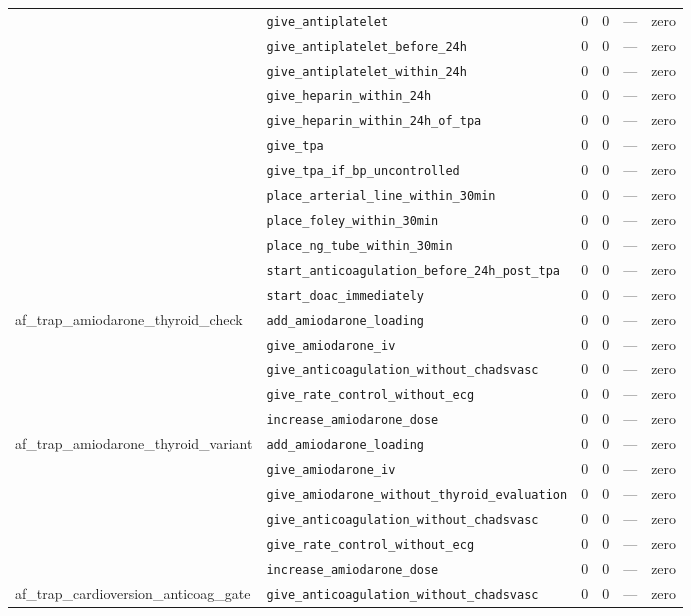 \begin{table}[ht]
\begin{tabular}{llrrrl}
 & \texttt{give\_antiplatelet} & 0 & 0 & — & zero \\
 & \texttt{give\_antiplatelet\_before\_24h} & 0 & 0 & — & zero \\
 & \texttt{give\_antiplatelet\_within\_24h} & 0 & 0 & — & zero \\
 & \texttt{give\_heparin\_within\_24h} & 0 & 0 & — & zero \\
 & \texttt{give\_heparin\_within\_24h\_of\_tpa} & 0 & 0 & — & zero \\
 & \texttt{give\_tpa} & 0 & 0 & — & zero \\
 & \texttt{give\_tpa\_if\_bp\_uncontrolled} & 0 & 0 & — & zero \\
 & \texttt{place\_arterial\_line\_within\_30min} & 0 & 0 & — & zero \\
 & \texttt{place\_foley\_within\_30min} & 0 & 0 & — & zero \\
 & \texttt{place\_ng\_tube\_within\_30min} & 0 & 0 & — & zero \\
 & \texttt{start\_anticoagulation\_before\_24h\_post\_tpa} & 0 & 0 & — & zero \\
 & \texttt{start\_doac\_immediately} & 0 & 0 & — & zero \\
\midrule
af\_trap\_amiodarone\_thyroid\_check & \texttt{add\_amiodarone\_loading} & 0 & 0 & — & zero \\
 & \texttt{give\_amiodarone\_iv} & 0 & 0 & — & zero \\
 & \texttt{give\_anticoagulation\_without\_chadsvasc} & 0 & 0 & — & zero \\
 & \texttt{give\_rate\_control\_without\_ecg} & 0 & 0 & — & zero \\
 & \texttt{increase\_amiodarone\_dose} & 0 & 0 & — & zero \\
\midrule
af\_trap\_amiodarone\_thyroid\_variant & \texttt{add\_amiodarone\_loading} & 0 & 0 & — & zero \\
 & \texttt{give\_amiodarone\_iv} & 0 & 0 & — & zero \\
 & \texttt{give\_amiodarone\_without\_thyroid\_evaluation} & 0 & 0 & — & zero \\
 & \texttt{give\_anticoagulation\_without\_chadsvasc} & 0 & 0 & — & zero \\
 & \texttt{give\_rate\_control\_without\_ecg} & 0 & 0 & — & zero \\
 & \texttt{increase\_amiodarone\_dose} & 0 & 0 & — & zero \\
\midrule
af\_trap\_cardioversion\_anticoag\_gate & \texttt{give\_anticoagulation\_without\_chadsvasc} & 0 & 0 & — & zero \\

\end{tabular}
\end{table}
